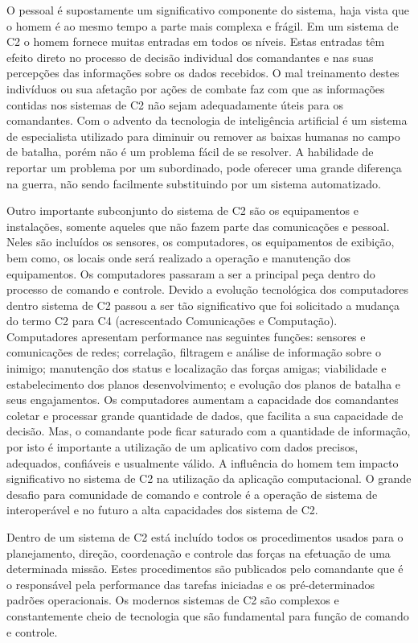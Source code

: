 \hspace{1.5cm}
O pessoal é supostamente um significativo componente do sistema, haja vista que o homem é ao mesmo tempo a parte mais complexa e frágil. Em um sistema de C2 o homem fornece muitas entradas em todos os níveis. Estas entradas têm efeito direto no processo de decisão individual dos comandantes e nas suas percepções das informações  sobre os dados recebidos. O mal treinamento destes indivíduos ou sua afetação por ações de combate faz com que as informações contidas nos sistemas de C2 não sejam adequadamente úteis para os comandantes. Com o advento da tecnologia de inteligência artificial é um sistema de especialista utilizado para diminuir ou remover as baixas humanas no campo de batalha, porém não é um problema fácil de se resolver. A habilidade de reportar um problema por um subordinado, pode oferecer uma grande diferença na guerra, não sendo facilmente substituindo por um sistema automatizado.

\hspace{1.5cm}
Outro importante subconjunto do sistema de C2 são os equipamentos e instalações, somente aqueles que não fazem parte das comunicações e pessoal. Neles são incluídos os sensores, os computadores, os equipamentos de exibição, bem como, os locais onde será realizado a operação e manutenção dos equipamentos. Os computadores passaram a ser a principal peça dentro do processo de comando e controle. Devido a evolução tecnológica dos computadores dentro sistema de C2 passou a ser tão significativo que foi solicitado a mudança do termo C2 para C4 (acrescentado Comunicações e Computação). Computadores apresentam performance nas seguintes funções: sensores e comunicações de redes; correlação, filtragem e análise de informação sobre o inimigo; manutenção dos status e localização das forças amigas; viabilidade e estabelecimento dos planos desenvolvimento; e evolução dos planos de batalha e seus engajamentos. Os computadores aumentam a capacidade dos comandantes coletar e processar grande quantidade de dados, que facilita a sua capacidade de decisão. Mas, o comandante pode ficar saturado com a quantidade de informação, por isto é importante a utilização de um aplicativo com dados precisos, adequados, confiáveis e usualmente válido. A influência do homem tem impacto significativo no sistema de C2 na utilização da aplicação computacional. O grande desafio para comunidade de comando e controle é a operação de sistema de interoperável e no futuro a alta capacidades dos sistema de C2.

\hspace{1.5cm}
Dentro de um sistema de C2 está incluído todos os procedimentos usados para o planejamento, direção, coordenação e controle das forças na efetuação de uma determinada missão. Estes procedimentos são publicados pelo comandante que é o responsável pela performance das tarefas iniciadas e os pré-determinados padrões operacionais. Os modernos sistemas de C2 são complexos e constantemente cheio de tecnologia que são fundamental para função de comando e controle.

